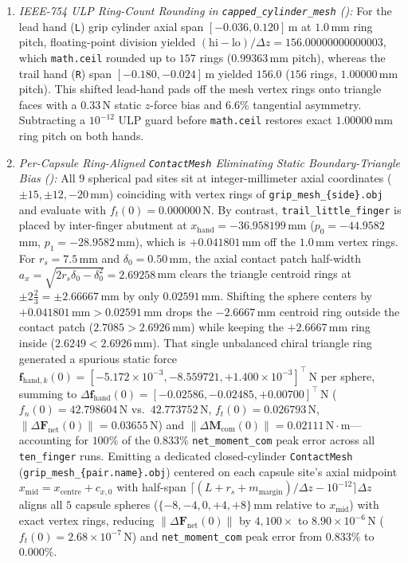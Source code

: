 \documentclass[11pt,a4paper]{article}
\begin{document}
\begin{enumerate}[leftmargin=*,noitemsep]
\item \textit{IEEE-754 ULP Ring-Count Rounding in \texttt{capped\_cylinder\_mesh} ():} For the lead hand (\texttt{L}) grip cylinder axial span $[-0.036, 0.120]$\,m at $1.0$\,mm ring pitch, floating-point division yielded $(\mathrm{hi} - \mathrm{lo}) / \Delta z = 156.00000000000003$, which \texttt{math.ceil} rounded up to $157$ rings ($0.99363$\,mm pitch), whereas the trail hand (\texttt{R}) span $[-0.180, -0.024]$\,m yielded $156.0$ ($156$ rings, $1.00000$\,mm pitch). This shifted lead-hand pads off the mesh vertex rings onto triangle faces with a $0.33$\,N static $z$-force bias and $6.6\%$ tangential asymmetry. Subtracting a $10^{-12}$ ULP guard before \texttt{math.ceil} restores exact $1.00000$\,mm ring pitch on both hands.
\item \textit{Per-Capsule Ring-Aligned \texttt{ContactMesh} Eliminating Static Boundary-Triangle Bias ():} All $9$ spherical pad sites sit at integer-millimeter axial coordinates ($\pm 15, \pm 12, -20$\,mm) coinciding with vertex rings of \texttt{grip\_mesh\_\{side\}.obj} and evaluate with $f_t(0) = 0.000000$\,N. By contrast, \texttt{trail\_little\_finger} is placed by inter-finger abutment at $x_{\mathrm{hand}} = -36.958199$\,mm ($p_0 = -44.9582$\,mm, $p_1 = -28.9582$\,mm), which is $+0.041801$\,mm off the $1.0$\,mm vertex rings. For $r_s = 7.5$\,mm and $\delta_0 = 0.50$\,mm, the axial contact patch half-width $a_x = \sqrt{2 r_s \delta_0 - \delta_0^2} = 2.69258$\,mm clears the triangle centroid rings at $\pm 2\tfrac{2}{3} = \pm 2.66667$\,mm by only $0.02591$\,mm. Shifting the sphere centers by $+0.041801\,\mathrm{mm} > 0.02591\,\mathrm{mm}$ drops the $-2.6667$\,mm centroid ring outside the contact patch ($2.7085 > 2.6926$\,mm) while keeping the $+2.6667$\,mm ring inside ($2.6249 < 2.6926$\,mm). That single unbalanced chiral triangle ring generated a spurious static force $\mathbf{f}_{\mathrm{hand},k}(0) = [-5.172\times 10^{-3}, -8.559721, +1.400\times 10^{-3}]^{\top}$\,N per sphere, summing to $\Delta\mathbf{f}_{\mathrm{hand}}(0) = [-0.02586, -0.02485, +0.00700]^{\top}$\,N ($f_n(0) = 42.798604$\,N vs.\ $42.773752$\,N, $f_t(0) = 0.026793$\,N, $\|\Delta\mathbf{F}_{\mathrm{net}}(0)\| = 0.03655$\,N) and $\|\Delta\mathbf{M}_{\mathrm{com}}(0)\| = 0.02111\,\mathrm{N\cdot m}$---accounting for $100\%$ of the $0.833\%$ \texttt{net\_moment\_com} peak error across all \texttt{ten\_finger} runs. Emitting a dedicated closed-cylinder \texttt{ContactMesh} (\texttt{grip\_mesh\_\{pair.name\}.obj}) centered on each capsule site's axial midpoint $x_{\mathrm{mid}} = x_{\mathrm{centre}} + c_{x,0}$ with half-span $\lceil(L + r_s + m_{\mathrm{margin}})/\Delta z - 10^{-12}\rceil \Delta z$ aligns all $5$ capsule spheres ($\{-8, -4, 0, +4, +8\}$\,mm relative to $x_{\mathrm{mid}}$) with exact vertex rings, reducing $\|\Delta\mathbf{F}_{\mathrm{net}}(0)\|$ by $4{,}100\times$ to $8.90 \times 10^{-6}$\,N ($f_t(0) = 2.68 \times 10^{-7}$\,N) and \texttt{net\_moment\_com} peak error from $0.833\%$ to $\mathbf{0.000\%}$.

\end{enumerate}
\end{document}
